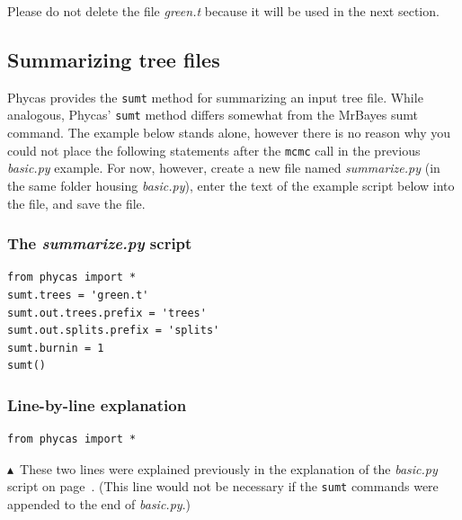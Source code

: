 \documentclass[10pt]{article}
\newcommand{\pathname}[1]{{\em #1}}				%
\newcommand{\code}[1]{{\tt #1}}					%
\newcommand{\cmd}[1]{{\tt \small #1}\index{#1}}	%
\newcommand{\pointup}{$\blacktriangle$}
\begin{document}
Please do not delete the file \pathname{green.t} because it will be used in the next section.

\subsection{Summarizing tree files}

Phycas provides the \cmd{sumt} method for summarizing an input tree file. While analogous, Phycas' \cmd{sumt} method differs somewhat from the MrBayes sumt command. The example below stands alone, however there is no reason why you could not place the following statements after the \cmd{mcmc} call in the previous \pathname{basic.py} example. For now, however, create a new file named \pathname{summarize.py} (in the same folder housing \pathname{basic.py}), enter the text of the example script below into the file, and save the file.

\subsubsection{The \pathname{summarize.py} script}
\begin{verbatim}
from phycas import *
sumt.trees = 'green.t'
sumt.out.trees.prefix = 'trees'
sumt.out.splits.prefix = 'splits'
sumt.burnin = 1
sumt()
\end{verbatim}

\subsubsection{Line-by-line explanation}
\begin{samepage}
\begin{verbatim}
from phycas import *
\end{verbatim}
\pointup\ These two lines were explained previously in the explanation of the \pathname{basic.py} script on page~\pageref{subsubsec:basicpyexplanation}. (This line would not be necessary if the \code{sumt} commands were appended to the end of \pathname{basic.py}.)
\end{samepage}
\end{document}
